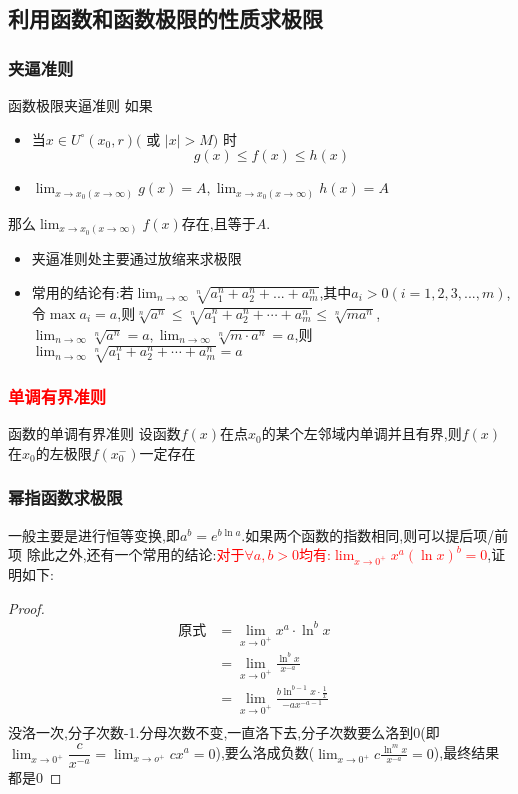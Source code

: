 \documentclass[10pt, a4paper, oneside, UTF8]{ctexbook}
\begin{document}
\begin{sloppypar}
    \subsection{利用函数和函数极限的性质求极限}
    \subsubsection{夹逼准则}
    \begin{defn}{函数极限夹逼准则}{}
        如果
        \begin{itemize}
            \item 当$x\in U^{\circ}(x_{0},r)($ 或 $|x|>M)$ 时
                  $$
                      g(x)\leqslant f(x) \leqslant h(x)
                  $$
            \item $\lim_{x\to x_0(x\to\infty)}g(x)=A,\lim_{x\to x_0(x\to\infty)}h(x)=A$
        \end{itemize}
        那么$\lim_{x\to x_0(x\to\infty)}f(x)$存在,且等于$A$.
    \end{defn}
    \begin{itemize}
        \item 夹逼准则处主要通过放缩来求极限
        \item 常用的结论有:若$\lim _{n \to \infty} \sqrt[n]{a_1^n+a_2^n+...+a_m^n}$,其中$a_i >0(i=1,2,3,...,m)$,令$\max{a_i}=a$,则$\sqrt[n]{a^n}\leqslant\sqrt[n]{a_1^n+a_2^n+\cdots+a_m^n}\leqslant\sqrt[n]{ma^n}$,\\$\lim_{n\to\infty}\sqrt[n]{a^n}=a,\lim_{n\to\infty}\sqrt[n]{m\cdot a^n}=a$,则$\operatorname*{lim}_{n\to\infty}\sqrt[n]{a_1^n+a_2^n+\cdots+a_m^n}=a$
    \end{itemize}
    \subsubsection{\textcolor{red}{单调有界准则}}
    \begin{defn}{函数的单调有界准则}{}
        设函数$f(x)$在点$x_0$的某个左邻域内单调并且有界,则$f(x)$在$x_0$的左极限$f(x_0^-)$一定存在
    \end{defn} 
    \subsubsection{幂指函数求极限}
    一般主要是进行恒等变换,即$a^b=e^{b\ln a}$.如果两个函数的指数相同,则可以提后项/前项
    除此之外,还有一个常用的结论:\textcolor{red}{对于$\forall a,b>0$均有:$\lim_{x\to 0^+}x^a(\ln x)^b=0$},证明如下:
    \begin{proof}
        \begin{align*}
            \text{原式} & = \lim_{x\to0^{+}}x^{a}\cdot\ln^{b}x & \\
             & = \lim_{x\to0^{+}}\frac{\ln^{b}x}{x^{-a}} &\\
             & =\lim_{x\to0^{+}}\frac{b\ln^{b-1}x\cdot\frac{1}{x}}{-ax^{-a-1}}&\\
        \end{align*}
    没洛一次,分子次数-1.分母次数不变,一直洛下去,分子次数要么洛到0(即$\lim_{x\to 0^+}\dfrac{c}{x^{-a}}=\lim_{x\to o^+} cx^a=0$),要么洛成负数($\lim_{x\to 0^+ }c\frac{\ln^m x}{x^{-a}}=0$),最终结果都是0
    \end{proof}
    

\end{sloppypar}
\end{document}
